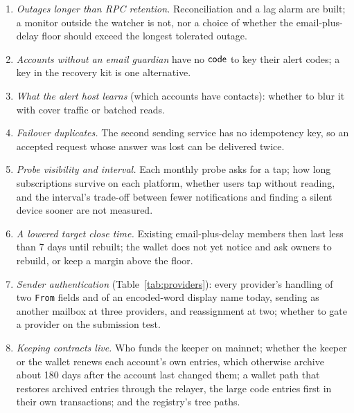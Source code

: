 \begin{enumerate}
    under a fixed topic from \texttt{\_\_check\_auth} would let a topic
    filter select the votes, revealing nothing the account's configuration
    does not; it needs a new guardian for every account.
  \item \emph{Outages longer than RPC retention.} Reconciliation and a lag
    alarm are built; a monitor outside the watcher is not, nor a choice of
    whether the email-plus-delay floor should exceed the longest tolerated
    outage.
  \item \emph{Accounts without an email guardian} have no $\mathsf{code}$ to key
    their alert codes; a key in the recovery kit is one alternative.
  \item \emph{What the alert host learns} (which accounts have contacts):
    whether to blur it with cover traffic or batched reads.
  \item \emph{Failover duplicates.} The second sending service has no
    idempotency key, so an accepted request whose answer was lost can be
    delivered twice.
  \item \emph{Probe visibility and interval.} Each monthly probe asks for a
    tap; how long subscriptions survive on each platform, whether users tap
    without reading, and the interval's trade-off between fewer
    notifications and finding a silent device sooner are not measured.
  \item \emph{A lowered target close time.} Existing email-plus-delay members
    then last less than 7 days until rebuilt; the wallet does not yet notice
    and ask owners to rebuild, or keep a margin above the floor.
  \item \emph{Sender authentication} (Table~\ref{tab:providers}): every
    provider's handling of two \texttt{From} fields and of an encoded-word
    display name today, sending as another mailbox at three providers, and
    reassignment at two; whether to gate a provider on the submission test.
  \item \emph{Keeping contracts live.} Who funds the keeper on mainnet;
    whether the keeper or the wallet renews each account's own entries, which
    otherwise archive about 180 days after the account last changed them;
    a wallet path that restores archived entries through the relayer, the
    large code entries first in their own transactions; and the registry's
    tree paths.
\end{enumerate}
